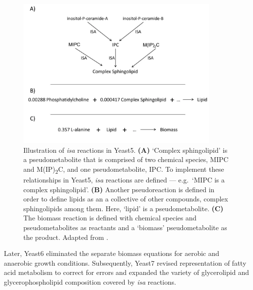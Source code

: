 \begin{figure}
  \centering
  \includegraphics[width=0.9\textwidth]{heavnerYeastExpandedReconstruction2012_1}
  \caption[
    Illustration of \textit{isa} reactions in Yeast5.
  ]{
    Illustration of \textit{isa} reactions in Yeast5.
    \textbf{(A)} `Complex sphingolipid' is a pseudometabolite that is comprised of two chemical species, MIPC and M(IP)\textsubscript{2}C, and one pseudometabolite, IPC\@.
    To implement these relationships in Yeast5, \textit{isa} reactions are defined --- e.g.\ `MIPC is a complex sphingolipid'.
    \textbf{(B)} Another pseudoreaction is defined in order to define lipids as an a collective of other compounds, complex sphingolipids among them.
    Here, `lipid' is a pseudometabolite.
    \textbf{(C)} The biomass reaction is defined with chemical species and pseudometabolites as reactants and a `biomass' pseudometabolite as the product.
    Adapted from \textcite{heavnerYeastExpandedReconstruction2012}.
    }
  \label{fig:intro-fba-isa}
\end{figure}

Later, Yeast6 \parencite{heavnerVersionConsensusYeast2013} eliminated the separate biomass equations for aerobic and anaerobic growth conditions.
Subsequently, Yeast7 \parencite{aungRevisingRepresentationFatty2013} revised representation of fatty acid metabolism to correct for errors and expanded the variety of glycerolipid and glycerophospholipid composition covered by \textit{isa} reactions.

